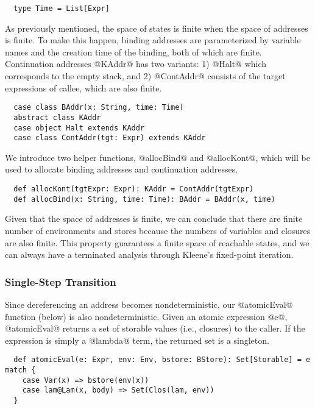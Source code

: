 \documentclass[acmsmall, review]{acmart}\settopmatter{}
\begin{document}
\begin{lstlisting}
  type Time = List[Expr]
\end{lstlisting}

As previously mentioned, the space of states is finite when the space of addresses is finite.
To make this happen, binding addresses are parameterized by variable names and the creation
time of the binding, both of which are finite. Continuation addresses @KAddr@ has two variants:
1) @Halt@ which corresponds to the empty stack, and
2) @ContAddr@ consists of the target expressions of callee, which are also finite.

\begin{lstlisting}
  case class BAddr(x: String, time: Time) 
  abstract class KAddr
  case object Halt extends KAddr
  case class ContAddr(tgt: Expr) extends KAddr
\end{lstlisting}

We introduce two helper functions, @allocBind@ and @allocKont@, which will be
used to allocate binding addresses and continuation addresses.

\begin{lstlisting}
  def allocKont(tgtExpr: Expr): KAddr = ContAddr(tgtExpr)
  def allocBind(x: String, time: Time): BAddr = BAddr(x, time)
\end{lstlisting}

Given that the space of addresses is finite, we can conclude that there are finite number
of environments and stores because the numbers of variables and closures are also finite.
This property guarantees a finite space of reachable states, and we can always have a
terminated analysis through Kleene's fixed-point iteration.

\subsubsection{Single-Step Transition}

Since dereferencing an address becomes nondeterministic, our @atomicEval@
function (below) is also nondeterministic. Given an atomic expression @e@,
@atomicEval@ returns a set of storable values (i.e., closures) to the caller.
If the expression is simply a @lambda@ term, the returned set is a singleton.

\begin{lstlisting}
  def atomicEval(e: Expr, env: Env, bstore: BStore): Set[Storable] = e match {
    case Var(x) => bstore(env(x))
    case lam@Lam(x, body) => Set(Clos(lam, env))
  }
\end{lstlisting}
\end{document}
